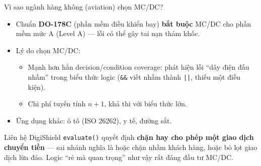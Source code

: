 \documentclass[aspectratio=169,12pt]{beamer}
\begin{document}
\begin{frame}{Vì sao ngành hàng không (aviation) chọn MC/DC?}
  \begin{itemize}
    \item Chuẩn \textbf{DO-178C} \cite{do178c} (phần mềm điều khiển bay)
          \textbf{bắt buộc} MC/DC cho phần mềm mức A (Level A) --- lỗi có thể
          gây tai nạn thảm khốc.
    \item Lý do chọn MC/DC:
    \begin{itemize}
      \item Mạnh hơn hẳn decision/condition coverage: phát hiện lỗi
            ``dây điện đấu nhầm'' trong biểu thức logic
            (\texttt{\&\&} viết nhầm thành \texttt{||}, thiếu một điều kiện).
      \item Chi phí tuyến tính $n+1$, khả thi với biểu thức lớn.
    \end{itemize}
    \item Ứng dụng khác: ô tô (ISO 26262), y tế, đường sắt.
  \end{itemize}

  \begin{alertblock}{Liên hệ DigiShield}
    \texttt{evaluate()} quyết định \textbf{chặn hay cho phép một giao dịch
    chuyển tiền} --- sai nhánh nghĩa là hoặc chặn nhầm khách hàng,
    hoặc bỏ lọt giao dịch lừa đảo. Logic ``rẻ mà quan trọng'' như vậy
    rất đáng đầu tư MC/DC.
  \end{alertblock}
\end{frame}
\end{document}
